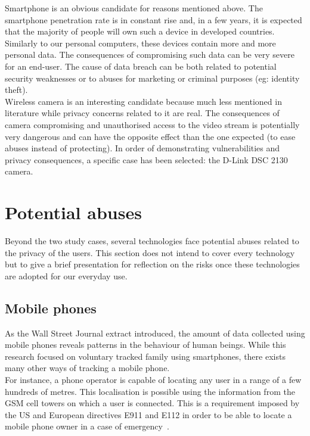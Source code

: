 Smartphone is an obvious candidate for reasons mentioned above.
The smartphone penetration rate is in constant rise and, in a few years, it is expected that the majority of people will own such a device in developed countries.
Similarly to our personal computers, these devices contain more and more personal data.
The consequences of compromising such data can be very severe for an end-user.
The cause of data breach can be both related to potential security weaknesses or to abuses for marketing or criminal purposes (eg: identity theft).\\

Wireless camera is an interesting candidate because much less mentioned in literature while privacy concerns related to it are real.
The consequences of camera compromising and unauthorised access to the video stream is potentially very dangerous and can have the opposite effect than the one expected (to ease abuses instead of protecting).
In order of demonstrating vulnerabilities and privacy consequences, a specific case has been selected: the D-Link DSC 2130 camera.

\section*{Potential abuses}

Beyond the two study cases, several technologies face potential abuses related to the privacy of the users.
This section does not intend to cover every technology but to give a brief presentation for reflection on the risks once these technologies are adopted for our everyday use.\\

\subsection*{Mobile phones}

As the Wall Street Journal extract introduced, the amount of data collected using mobile phones reveals patterns in the behaviour of human beings.
While this research focused on voluntary tracked family using smartphones, there exists many other ways of tracking a mobile phone.\\

For instance, a phone operator is capable of locating any user in a range of a few hundreds of metres.
This localisation is possible using the information from the GSM cell towers on which a user is connected.
This is a requirement imposed by the US and European directives E911 and E112 in order to be able to locate a mobile phone owner in a case of emergency~\cite{e112-recom}.\\

